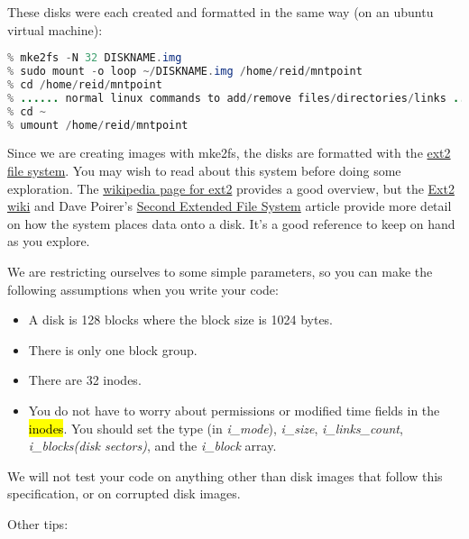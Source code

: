 \documentclass[12pt]{article}
\begin{document}
\bigskip

These disks were each created and formatted in the same way (on an ubuntu virtual machine):

\bigskip

\begin{lstlisting}[language=Java,caption={lesson\_01/Prompter.java}]
% dd if=/dev/zero of=~/DISKNAME.img bs=1024 count=128
% mke2fs -N 32 DISKNAME.img
% sudo mount -o loop ~/DISKNAME.img /home/reid/mntpoint
% cd /home/reid/mntpoint
% ...... normal linux commands to add/remove files/directories/links .....
% cd ~
% umount /home/reid/mntpoint
\end{lstlisting}

\bigskip

Since we are creating images with mke2fs, the disks are formatted with the \href{https://en.wikipedia.org/wiki/Ext2}{ext2
file system}. You may wish to read about this system before doing some exploration.
The \href{http://en.wikipedia.org/wiki/Ext2}{wikipedia page for ext2} provides a
good overview, but the \href{http://wiki.osdev.org/Ext2}{Ext2 wiki} and Dave
Poirer's \href{http://www.nongnu.org/ext2-doc/index.html}{Second Extended File System}
article provide more detail on how the system places data onto a disk. It's a good
reference to keep on hand as you explore.

\bigskip

We are restricting ourselves to some simple parameters, so you can make the
following assumptions when you write your code:

\bigskip

\begin{itemize}
    \item A disk is 128 blocks where the block size is 1024 bytes.
    \item There is only one block group.
    \item There are 32 inodes.
    \item You do not have to worry about permissions or modified time fields in
    the \hl{inodes}. You should set the type (in \textit{i\_mode}), \textit{i\_size},
    \textit{i\_links\_count}, \textit{i\_blocks(disk sectors)}, and the \textit{i\_block}
    array.
\end{itemize}

We will not test your code on anything other than disk images that follow this
specification, or on corrupted disk images.

Other tips:
\end{document}

